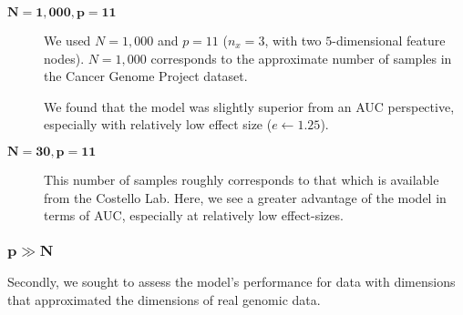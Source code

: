 \begin{description}
\item[$\mathbf{N=1,000, p=11}$] We used $N=1,000$ and $p=11$
  ($n_x = 3$, with two $5$-dimensional feature nodes). $N=1,000$
  corresponds to the approximate number of samples in the Cancer
  Genome Project\cite{ledford_end_2015} dataset.

  We found that the model was slightly superior from an AUC
  perspective, especially with relatively low effect size
  ($e \leftarrow 1.25$). 


        


  
  \item[$\mathbf{N=30,p=11}$] This number of samples roughly
    corresponds to that which is available from the Costello
    Lab. Here, we see a greater advantage of the model in terms of
    AUC, especially at relatively low effect-sizes. 
  \end{description}

\subsubsection{$\mathbf{p \gg N}$}

Secondly, we sought to assess the model's performance for data with dimensions that approximated the dimensions of real genomic data.

